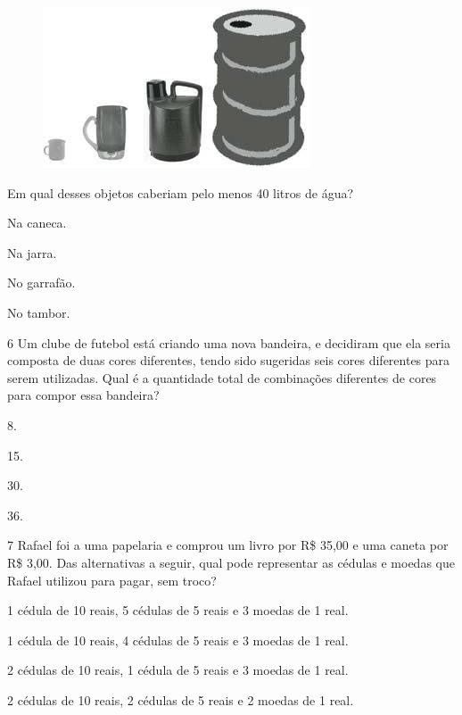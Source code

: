 \begin{figure}[htpb!]
\centering
\includegraphics[width=.7\textwidth]{media/image87.jpg}
\end{figure}

Em qual desses objetos caberiam pelo menos 40 litros de água?

\begin{multicols}{2}
\begin{escolha}
\item
  Na caneca.
\item
  Na jarra.
\item
  No garrafão.
\item
  No tambor.
\end{escolha}
\end{multicols}


\num{6} Um clube de futebol está criando uma nova bandeira, e decidiram que ela seria composta de duas cores diferentes, tendo sido sugeridas seis cores
diferentes para serem utilizadas. Qual é a quantidade total de combinações
diferentes de cores para compor essa bandeira?

\begin{escolha}
\item
  8.
\item
  15.
\item
  30.
\item
  36.
\end{escolha}


\num{7} Rafael foi a uma papelaria e comprou um livro por R\$ 35,00 e uma caneta
por R\$ 3,00. Das alternativas a seguir, qual pode representar as cédulas
e moedas que Rafael utilizou para pagar, sem troco?

\begin{escolha}
\item
  1 cédula de 10 reais, 5 cédulas de 5 reais e 3 moedas de 1 real.
\item
  1 cédula de 10 reais, 4 cédulas de 5 reais e 3 moedas de 1 real.
\item
  2 cédulas de 10 reais, 1 cédula de 5 reais e 3 moedas de 1 real.
\item
  2 cédulas de 10 reais, 2 cédulas de 5 reais e 2 moedas de 1 real.
\end{escolha}


